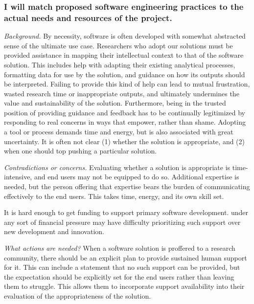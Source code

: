 \documentclass[a4paper,UKenglish]{dagman}
\renewcommand{\paragraph}[1]{\subsubsection*{#1}\xspace}
\begin{document}
\paragraph{I will match proposed software engineering practices to the actual needs and resources of the project.}



\emph{Background.}
By necessity, software is often developed with somewhat abstracted sense of the ultimate use case. Researchers who adopt our solutions must be provided assistance in mapping their intellectual context to that of the software solution. This includes help with adapting their existing analytical processes, formatting data for use by the solution, and guidance on how its outputs should be interpreted. Failing to provide this kind of help can lead to mutual frustration, wasted research time or inappropriate outputs, and ultimately undermines the value and sustainability of the solution. Furthermore, being in the trusted position of providing guidance and feedback has to be continually legitimized by responding to real concerns in ways that empower, rather than shame. Adopting a tool or process demands time and energy, but is also associated with great uncertainty. It is often not clear (1) whether the solution is appropriate, and (2) when one should top pushing a particular solution.

\emph{Contradictions or concerns.}
Evaluating whether a solution is appropriate is time-intensive, and end users may not be equipped to do so. Additional expertise is needed, but the person offering that expertise bears the burden of communicating effectively to the end users. This takes time, energy, and its own skill set.

It is hard enough to get funding to support primary software development.  under any sort of financial pressure may have difficulty prioritizing such support over new development and innovation. 

\emph{What actions are needed?}
When a software solution is proffered to a research community, there should be an explicit plan to provide sustained human support for it. This can include a statement that no such support can be provided, but the expectation should be explicitly set for the end users rather than leaving them to struggle. This allows them to incorporate support availability into their evaluation of the appropriateness of the solution. 
\end{document}
